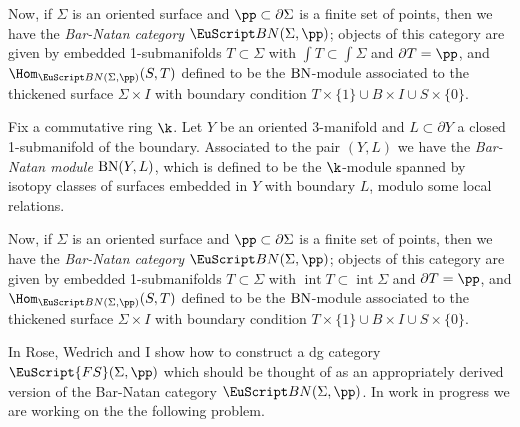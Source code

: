 \documentclass[11pt]{amsart}
\newcommand{\gl}{\mathfrak{gl}}
\begin{document}
Now, if $\Sigma$ is an oriented surface and $\pp\subset \partial \Sigma$ is a finite set of points, then we have the \emph{Bar-Natan category} $\BN(\Sigma,\pp)$; objects of this category are given by embedded 1-submanifolds $T\subset\Sigma$ with $\int T \subset \int \Sigma$ and $\partial T=\pp$, and $\Hom_{\BN(\Sigma,\pp)}(S,T)$ defined to be the $\mathrm{BN}$-module associated to the thickened surface $\Sigma\times I$ with boundary condition $T\times\{1\}\cup B\times I\cup S\times\{0\}$.



\renewcommand{\int}{\operatorname{int}}

Fix a commutative ring $\k$.  Let $Y$ be an oriented 3-manifold and $L\subset \partial Y$ a closed 1-submanifold of the boundary. Associated to the pair $(Y,L)$ we have the \emph{Bar-Natan module} $\mathrm{BN}(Y,L)$, which is defined to be the $\k$-module spanned by isotopy classes of surfaces embedded in $Y$ with boundary $L$, modulo some local relations.


Now, if $\Sigma$ is an oriented surface and $\pp\subset \partial \Sigma$ is a finite set of points, then we have the \emph{Bar-Natan category} $\BN(\Sigma,\pp)$; objects of this category are given by embedded 1-submanifolds $T\subset\Sigma$ with $\int T \subset \int \Sigma$ and $\partial T=\pp$, and $\Hom_{\BN(\Sigma,\pp)}(S,T)$ defined to be the $\mathrm{BN}$-module associated to the thickened surface $\Sigma\times I$ with boundary condition $T\times\{1\}\cup B\times I\cup S\times\{0\}$.

In \cite{} Rose, Wedrich and I show how to construct a dg category $\EuScript{FS}(\Sigma,\pp)$ which should be thought of as an appropriately derived version of the Bar-Natan category $\BN(\Sigma,\pp)$.  In work in progress we are working on the the following problem.

\newcommand{\SkLas}{\mathrm{SkLas}}
\newcommand{\SkLa}{\EuScript{S}k\EuScript{L}as}


\newcommand{\FS}{\EuScript{F}}
\end{document}
